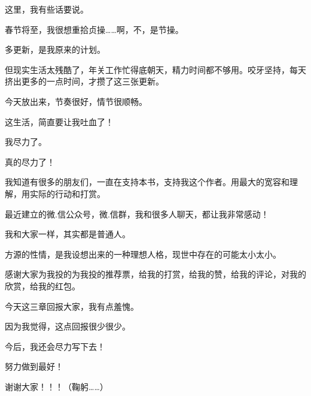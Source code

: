 \begin{this_body}
这里，我有些话要说。

春节将至，我很想重拾贞操……啊，不，是节操。

多更新，是我原来的计划。

但现实生活太残酷了，年关工作忙得底朝天，精力时间都不够用。咬牙坚持，每天挤出更多的一点时间，才攒了这三张更新。

今天放出来，节奏很好，情节很顺畅。

这生活，简直要让我吐血了！

我尽力了。

真的尽力了！

我知道有很多的朋友们，一直在支持本书，支持我这个作者。用最大的宽容和理解，用实际的行动和打赏。

最近建立的微.信公众号，微.信群，我和很多人聊天，都让我非常感动！

我和大家一样，其实都是普通人。

方源的性情，是我设想出来的一种理想人格，现世中存在的可能太小太小。

感谢大家为我投的为我投的推荐票，给我的打赏，给我的赞，给我的评论，对我的欣赏，给我的红包。

今天这三章回报大家，我有点羞愧。

因为我觉得，这点回报很少很少。

今后，我还会尽力写下去！

努力做到最好！

谢谢大家！！！（鞠躬……）

\end{this_body}


